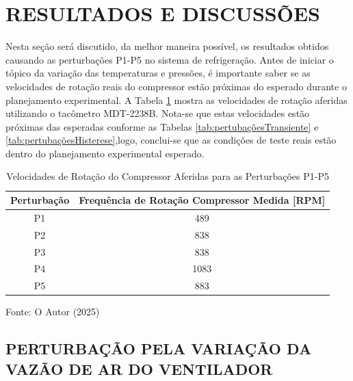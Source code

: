 \section{RESULTADOS E DISCUSSÕES}

Nesta seção será discutido, da melhor maneira possível, os resultados obtidos causando as perturbações P1-P5 no sistema de refrigeração. Antes de iniciar o tópico da variação das temperaturas e pressões, é importante saber se as velocidades de rotação reais do compressor estão próximas do esperado durante o planejamento experimental. A Tabela \ref{tab:Rotações Medidas} mostra as velocidades de rotação aferidas utilizando o tacômetro MDT-2238B. Nota-se que estas velocidades estão próximas das esperadas conforme as Tabelas \ref{tab:pertubaçõesTransiente} e \ref{tab:pertubaçõesHisterese},logo, conclui-se que as condições de teste reais estão dentro do planejamento experimental esperado.

\begin{table}[htb]
    \centering
    \begin{tabular}{|c|c|}
        \hline
        \textbf{Perturbação} & \textbf{Frequência de Rotação Compressor Medida [RPM]} \\
        \hline
        P1 & 489 \\
        P2 & 838 \\
        P3 & 838 \\        
        P4 & 1083 \\
        P5 & 883 \\
        \hline
    \end{tabular}
    \caption{Velocidades de Rotação do Compressor Aferidas para as Perturbações P1-P5}
    \vspace{5pt} 
{\footnotesize Fonte: O Autor (2025) }
    \label{tab:Rotações Medidas}
\end{table}

\subsection{\MakeUppercase{Perturbação pela Variação da Vazão de Ar do Ventilador}} \label{subsec:PertubaçãoVelVentilador}


